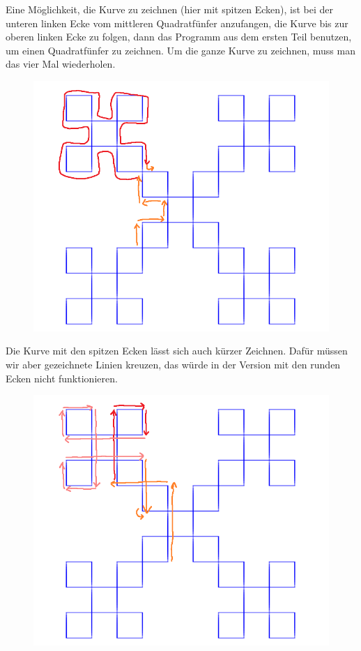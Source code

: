 \documentclass{article}
\begin{document}
Eine Möglichkeit, die Kurve zu zeichnen (hier mit spitzen Ecken), ist bei der unteren linken Ecke vom mittleren Quadratfünfer anzufangen, die Kurve bis zur oberen linken Ecke zu folgen, dann das Programm aus dem ersten Teil benutzen, um einen Quadratfünfer zu zeichnen. Um die ganze Kurve zu zeichnen, muss man das vier Mal wiederholen.
\begin{figure}[H]
\centering
\includegraphics[width=0.6\linewidth]{pictures/anticross-stitch-curve2-expl.png}
\end{figure}


Die Kurve mit den spitzen Ecken lässt sich auch kürzer Zeichnen. Dafür müssen wir aber gezeichnete Linien kreuzen, das würde in der Version mit den runden Ecken nicht funktionieren.
\begin{figure}[H]
\centering
\includegraphics[width=0.6\linewidth]{pictures/anticross-stitch-curve2-intersect-expl.png}
\end{figure}

\end{document}
